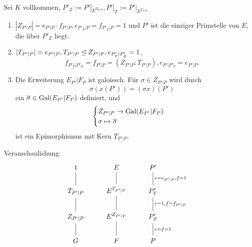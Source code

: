 \begin{satz}
    Sei $K$ vollkommen, $P'_Z := P'|_{E^{Z_{P'|P}}}, P'|_T := P'|_{E^{T_{P'|P}}}$
    \begin{enumerate}[label=(\alph*)]
        \item $|Z_{P'|P}| = e_{P'|P} \cdot f_{P'|P}, e_{P'_Z|P} = f_{P'_Z|P} = 1$ und $P'$ ist die einziger
        Primstelle von $E$, die über $P'_Z$ liegt.

        \item $|T_{P'|P}| = e_{P'|P}, T_{P'|P} \trianglelefteq Z_{P'|P}, e_{P'_T|P'_Z} = 1$,
        $$ f_{P'_T|P'_Z}=f_{P'|P} = (Z_{P'|P} : T_{P'|P}), e_{P'|P'_T}=e_{P'|P}.$$

        \item Die Erweiterung $E_{P'}| F_P$ ist galoissch. Für $\sigma \in Z_{P'|P}$ wird durch
        $$ \overline{\sigma}(x(P')) = (\sigma x)(P')$$
        ein $\overline{\sigma} \in \operatorname{Gal}(E_{P'}|F_P)$ definiert, und
        $$ \begin{cases}
            Z_{P'|P} \to \operatorname{Gal}(E_{P'}|F_P)\\
            \sigma \mapsto \overline{\sigma}
        \end{cases}$$
        ist ein Epimorphismus mit Kern $T_{P'|P}$.
    \end{enumerate}

    Veranschaulichung:
    $$\begin{tikzcd}
        1 \dar[dash]& E\dar[dash] & P'\dar[dash]{e=e_{P'|P}, f=1}\\
        T_{P'|P} \dar[dash]& E^{T_{P'|P}}\dar[dash] & P'_T\dar[dash]{e=1, f=f_{P'|P}}\\
        Z_{P'|P} \dar[dash]& E^{Z_{P'|P}}\dar[dash] & P'_Z\dar[dash]{e=f=1}\\
        G & F & P
    \end{tikzcd}$$
\end{satz}
